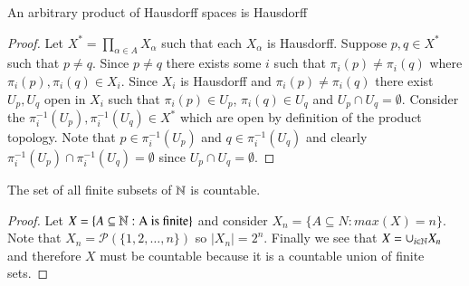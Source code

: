 \documentclass[minion]{homework651}
\begin{document}
\begin{problems}
\begin{subproblems}
\item An arbitrary product of Hausdorff spaces is Hausdorff
\begin{proof}
    Let $X^* = \prod_{\alpha \in A} X_\alpha$ such that each $X_\alpha$ is Hausdorff. Suppose $p, q \in X^*$ such that $p \neq q$. 
    Since $p \neq q$ there exists some $i$ such that $\pi_i(p) \neq \pi_i(q)$ where $\pi_i(p), \pi_i(q) \in X_i$. Since $X_i$ is Hausdorff 
    and $\pi_i(p) \neq \pi_i(q)$ there exist $U_p, U_q$ open in $X_i$ such that $\pi_i(p) \in U_p$, $\pi_i(q) \in U_q$ and $U_p \cap U_q = \emptyset$.
    Consider the $\pi_i^{-1}(U_p), \pi_i^{-1}(U_q) \in X^*$ which are open by definition of the product topology.
    Note that $p \in \pi_i^{-1}(U_p)$ and $q \in \pi_i^{-1}(U_q)$ and clearly $\pi_i^{-1}(U_p)\cap \pi_i^{-1}(U_q) = \emptyset$ since $U_p \cap U_q = \emptyset$.
\end{proof}


\begin{lemma}{1}
    The set of all finite subsets of $\mathbb N$ is countable.
    \begin{proof}
        Let $X = \{A \subseteq \mathbb N: \text{A is finite}\}$ and consider $X_n = \{A \subseteq N: max(X) = n\}$. Note that $X_n = \mathcal{P}(\{1, 2, \dots, n\})$ so $|X_n| = 2^n$. 
        Finally we see that $X = \cup_{i \in \mathbb N} X_n$ and therefore $X$ must be countable because it is a countable union of finite sets.  
    \end{proof}
\end{lemma}


\end{subproblems}
\end{problems}
\end{document}
